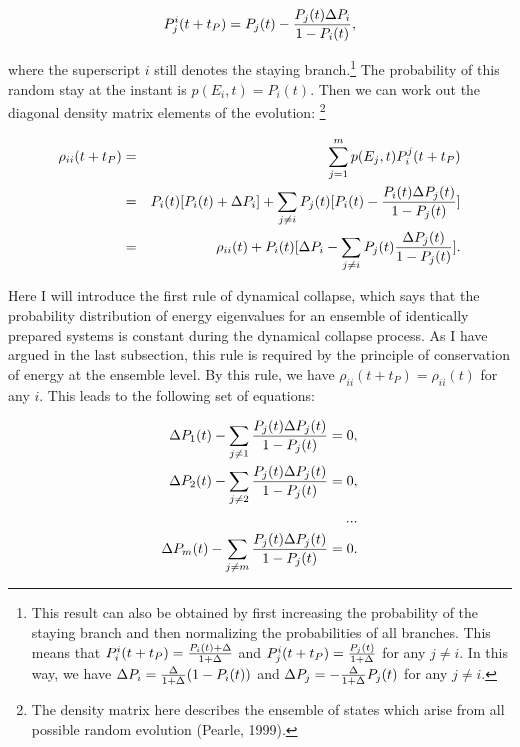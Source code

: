 \begin{equation}
P_{j}^i (t+t_P)=P_{j}(t)-{{P_{j}(t) \Delta P_{i}} \over {1-P_{i}(t)}},
\label{}
\end{equation} 

\noindent where the superscript $i$ still denotes the staying branch.\footnote{This result can also be obtained by first increasing the probability of the staying branch and then normalizing the probabilities of all branches. This means that $P_{i}^i(t+t_P)={{P_{i}(t)+\Delta }\over {1+\Delta }}$ and $P_{j}^i(t+t_P)={{P_{j}(t)}\over {1+\Delta}}$ for any $j \neq i$. In this way, we have $\Delta P_{i}={{\Delta}\over{1+\Delta}}(1-P_{i}(t))$ and $\Delta P_{j}=-{{\Delta}\over{1+\Delta}}P_{j}(t)$ for any $j \neq i$. } The probability of this random stay at the instant is $p(E_i,t)=P_{i}(t)$. Then we can work out the diagonal density matrix elements of the evolution: \footnote{The density matrix here describes the ensemble of states which arise from all possible random evolution (Pearle, 1999).}

\begin{eqnarray}
\rho_{ii}(t+t_P)&=&\sum_{j=1}^m p(E_j,t) P_{i}^j (t+t_P)\nonumber
\\&=&P_{i}(t)[P_{i}(t)+\Delta P_{i}]+\sum_{j \neq i} P_{j}(t)[P_{i}(t)-{{P_{i}(t) \Delta P_{j}(t)} \over {1-P_{j}(t)}}]\nonumber
\\ &=&\rho_{ii}(t)+P_{i}(t)[\Delta P_{i}-\sum_{j \neq i} P_{j}(t){{\Delta P_{j}(t)} \over {1-P_{j}(t)}}].
\label{}
\end{eqnarray}

Here I will introduce the first rule of dynamical collapse, which says that the probability distribution of energy eigenvalues for an ensemble of identically prepared systems is constant during the dynamical collapse process. As I have argued in the last subsection, this rule is required by the principle of conservation of energy at the ensemble level. By this rule, we have $\rho_{ii}(t+t_P)=\rho_{ii}(t)$ for any $i$. This leads to the following set of equations:

\begin{eqnarray}
\Delta P_{1}(t)-\sum_{j \neq 1}{{P_{j}(t)\Delta P_{j}(t)} \over {1-P_{j}(t)}}=0, \nonumber
\\
\Delta P_{2}(t)-\sum_{j \neq 2}{{P_{j}(t)\Delta P_{j}(t)} \over {1-P_{j}(t)}}=0, \nonumber
\\
...\nonumber
\\
\Delta P_{m}(t)-\sum_{j \neq m}{{P_{j}(t)\Delta P_{j}(t)} \over {1-P_{j}(t)}}=0.
\end{eqnarray}

